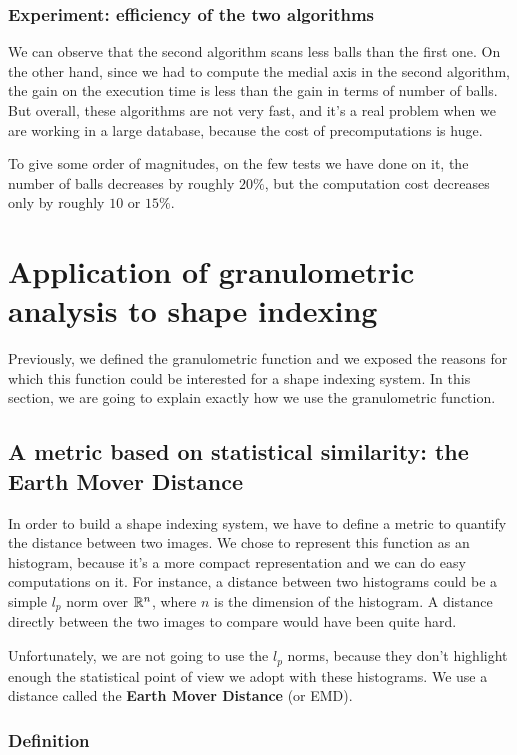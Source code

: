 \subsubsection{Experiment: efficiency of the two algorithms}

We can observe that the second algorithm scans less balls than the first one. On the other hand, since we had to compute the medial axis in the second algorithm, the gain on the execution time is less than the gain in terms of number of balls.
But overall, these algorithms are not very fast, and it's a real problem when we are working in a large database, because the cost of precomputations is huge.

To give some order of magnitudes, on the few tests we have done on it, the number of balls decreases by roughly $20 \%$, but the computation cost decreases only by roughly $10$ or $15 \%$.

\section{Application of granulometric analysis to shape indexing}

Previously, we defined the granulometric function and we exposed the reasons for which this function could be interested for a shape indexing system. In this section, we are going to explain exactly how we use the granulometric function.

\subsection{A metric based on statistical similarity: the Earth Mover Distance}

In order to build a shape indexing system, we have to define a metric to quantify the distance between two images. We chose to represent this function as an histogram, because it's a more compact representation and we can do easy computations on it. For instance, a distance between two histograms could be a simple $l_p$ norm over $\mathbb{R}^n$, where $n$ is the dimension of the histogram. A distance directly between the two images to compare would have been quite hard.

Unfortunately, we are not going to use the $l_p$ norms, because they don't highlight enough the statistical point of view we adopt with these histograms. We use a distance called the \textbf{Earth Mover Distance} (or EMD).

\subsubsection{Definition}

